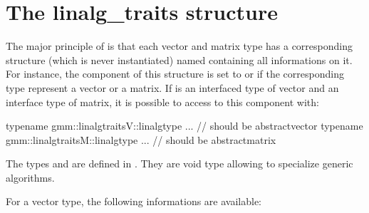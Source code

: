\documentclass[a4paper,11pt,english]{sphinxmanual}
\begin{document}
\section{The linalg\_traits structure}
\label{\detokenize{gmm/inside:the-linalg-traits-structure}}
\sphinxAtStartPar
The major principle of  is that each vector and matrix type has a corresponding structure (which is never instantiated) named  containing all informations on it. For instance, the component  of this structure is set to  or  if the corresponding type represent a vector or a matrix. If  is an interfaced type of vector and  an interface type of matrix, it is possible to access to this component with:

\begin{sphinxVerbatim}[commandchars=\\\{\}]
typename gmm::linalg\PYGZus{}traits\PYGZlt{}V\PYGZgt{}::linalg\PYGZus{}type ...  // should be abstract\PYGZus{}vector
typename gmm::linalg\PYGZus{}traits\PYGZlt{}M\PYGZgt{}::linalg\PYGZus{}type ...  // should be abstract\PYGZus{}matrix
\end{sphinxVerbatim}

\sphinxAtStartPar
The types  and  are defined in . They are void type allowing to specialize generic algorithms.

\sphinxAtStartPar
For a vector type, the following informations are available:
\end{document}
